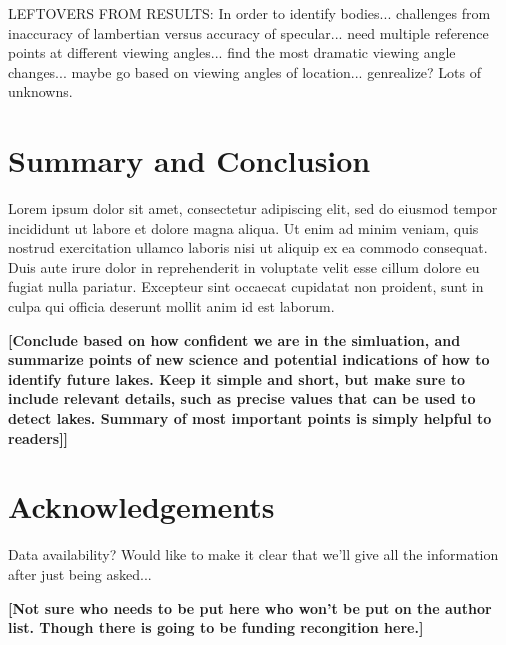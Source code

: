 \documentclass{article}
\begin{document}
\color{Green} LEFTOVERS FROM RESULTS: In order to identify bodies... challenges from inaccuracy of lambertian versus accuracy of specular... need multiple reference points at different viewing angles... find the most dramatic viewing angle changes... maybe go based on viewing angles of location... genrealize? Lots of unknowns. \color{black}

\section{Summary and Conclusion}
Lorem ipsum dolor sit amet, consectetur adipiscing elit, sed do eiusmod tempor incididunt ut labore et dolore magna aliqua. Ut enim ad minim veniam, quis nostrud exercitation ullamco laboris nisi ut aliquip ex ea commodo consequat. Duis aute irure dolor in reprehenderit in voluptate velit esse cillum dolore eu fugiat nulla pariatur. Excepteur sint occaecat cupidatat non proident, sunt in culpa qui officia deserunt mollit anim id est laborum. 

\textbf{\color{red}[Conclude based on how confident we are in the simluation, and summarize points of new science and potential indications of how to identify future lakes. Keep it simple and short, but make sure to include relevant details, such as precise values that can be used to detect lakes. Summary of most important points is simply helpful to readers]]\color{black}}

\section*{Acknowledgements}

\color{Green}Data availability? Would like to make it clear that we'll give all the information after just being asked...\color{black}

\textbf{\color{red}[Not sure who needs to be put here who won't be put on the author list. Though there is going to be funding recongition here.]\color{black}}

\printbibliography
\end{document}
